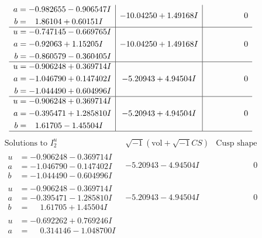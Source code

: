 \documentclass[1p]{elsarticle_modified}
\theoremstyle{definition}
\newcommand{\I}{\sqrt{-1}}
\begin{document}
$$\begin{array}{c|c|c}
\begin{aligned}
a &= -0.982655 - 0.906547 I \\
b &= \phantom{-}1.86104 + 0.60151 I\end{aligned}
 & -10.04250 + 1.49168 I & \phantom{-0.000000 } 0 \\ \hline\begin{aligned}
u &= -0.747145 - 0.669765 I \\
a &= -0.92063 + 1.15205 I \\
b &= -0.860579 - 0.360405 I\end{aligned}
 & -10.04250 + 1.49168 I & \phantom{-0.000000 } 0 \\ \hline\begin{aligned}
u &= -0.906248 + 0.369714 I \\
a &= -1.046790 + 0.147402 I \\
b &= -1.044490 + 0.604996 I\end{aligned}
 & -5.20943 + 4.94504 I & \phantom{-0.000000 } 0 \\ \hline\begin{aligned}
u &= -0.906248 + 0.369714 I \\
a &= -0.395471 + 1.285810 I \\
b &= \phantom{-}1.61705 - 1.45504 I\end{aligned}
 & -5.20943 + 4.94504 I & \phantom{-0.000000 } 0\\
 \hline 
 \end{array}$$\newpage$$\begin{array}{c|c|c}  
\text{Solutions to }I^u_{2}& \I (\text{vol} + \sqrt{-1}CS) & \text{Cusp shape}\\
 \hline 
\begin{aligned}
u &= -0.906248 - 0.369714 I \\
a &= -1.046790 - 0.147402 I \\
b &= -1.044490 - 0.604996 I\end{aligned}
 & -5.20943 - 4.94504 I & \phantom{-0.000000 } 0 \\ \hline\begin{aligned}
u &= -0.906248 - 0.369714 I \\
a &= -0.395471 - 1.285810 I \\
b &= \phantom{-}1.61705 + 1.45504 I\end{aligned}
 & -5.20943 - 4.94504 I & \phantom{-0.000000 } 0 \\ \hline\begin{aligned}
u &= -0.692262 + 0.769246 I \\
a &= \phantom{-}0.314146 - 1.048700 I \\

\end{aligned}
\end{array}$$
\end{document}
